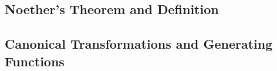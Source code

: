 \subsection{Noether's Theorem and Definition} %
\subsection{Canonical Transformations and Generating Functions}
